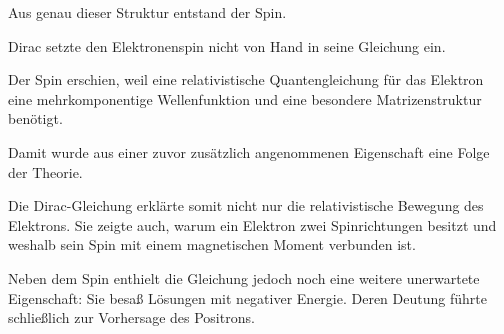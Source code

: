 Aus genau dieser Struktur entstand der Spin.

\begin{HistoryBox}
	\label{box:spin_theoretische_notwendigkeit}
	
	Dirac setzte den Elektronenspin nicht von Hand in seine Gleichung ein.
	
	Der Spin erschien, weil eine relativistische Quantengleichung für das
	Elektron eine mehrkomponentige Wellenfunktion und eine besondere
	Matrizenstruktur benötigt.
	
	Damit wurde aus einer zuvor zusätzlich angenommenen Eigenschaft eine
	Folge der Theorie.
\end{HistoryBox}

Die Dirac-Gleichung erklärte somit nicht nur die relativistische
Bewegung des Elektrons. Sie zeigte auch, warum ein Elektron zwei
Spinrichtungen besitzt und weshalb sein Spin mit einem magnetischen
Moment verbunden ist.

Neben dem Spin enthielt die Gleichung jedoch noch eine weitere
unerwartete Eigenschaft: Sie besaß Lösungen mit negativer Energie.
Deren Deutung führte schließlich zur Vorhersage des Positrons.

